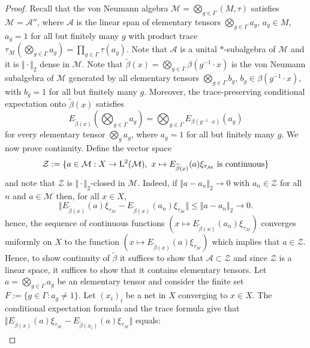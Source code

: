 \documentclass[12pt]{amsart} %
\theoremstyle{plain}
\theoremstyle{definition}
\begin{document}
\begin{proof}
Recall that the von Neumann algebra $\mathcal M=\bigotimes_{g\in\Gamma}(M,\tau)$ satisfies $\mathcal{M}=\mathcal{A}''$, where $\mathcal{A}$ is the linear span of elementary tensors $ \bigotimes_{g\in\Gamma}a_g$, $a_g\in M$,  $a_g=1$ for all but finitely many $g$ with product trace $\tau_{\mathcal M}\left(\bigotimes_{g\in\Gamma}a_g\right)=\prod_{g\in\Gamma}\tau(a_g)$. Note that $\mathcal{A}$ is a unital $*$-subalgebra of $\mathcal{M}$ and it is $\Vert\cdot\Vert_2$ dense in $\mathcal{M}$.
Note that $\widetilde\beta(x)
        =
        \bigotimes_{g\in\Gamma}\beta(g^{-1}\cdot x)$ is the von Neumann subalgebra of \(\mathcal M\) generated by all elementary tensors $\bigotimes_{g\in\Gamma}b_g$, $b_g\in\beta(g^{-1}\cdot x)$, with  $b_g=1$ for all but finitely many $g$. Moreover, the trace-preserving conditional expectation onto \(\widetilde\beta(x)\) satisfies
\[
        E_{\widetilde\beta(x)}
        \left(
        \bigotimes_{g\in\Gamma}a_g
        \right)
        =
        \bigotimes_{g\in\Gamma}E_{\beta(g^{-1}\cdot x)}(a_g)
\]
for every elementary tensor \(\bigotimes_g a_g\), where \(a_g=1\) for all but
finitely many \(g\).
\medskip
\noindent We now prove continuity. Define the vector space
$$\mathcal{Z}:=\{a\in\mathcal{M}:X\to{\rm L}^2(\mathcal{M}),\,\,x\mapsto E_{\widetilde{\beta}(x)}(a)\xi_{\tau_{\mathcal{M}}}\text{ is continuous}\}$$
and note that $\mathcal{Z}$ is $\Vert\cdot\Vert_2$-closed in $\mathcal{M}$. Indeed, if $\Vert a-a_n\Vert_2\to 0$ with $a_n\in\mathcal{Z}$ for all $n$ and $a\in\mathcal{M}$ then, for all $x\in X$,
$$\Vert E_{\widetilde{\beta}(x)}(a)\xi_{\tau_{\mathcal{M}}}-E_{\widetilde{\beta}(x)}(a_n)\xi_{\tau_{\mathcal{M}}}\Vert \leq\Vert a-a_n\Vert_2\rightarrow 0.$$
hence, the sequence of continuous functions $(x\mapsto E_{\widetilde{\beta}(x)}(a_n)\xi_{\tau_{\mathcal{M}}})$ converges uniformly on $X$ to the function $(x\mapsto E_{\widetilde{\beta}(x)}(a)\xi_{\tau_{\mathcal{M}}})$ which implies that $a\in\mathcal{Z}$. Hence, to show continuity of $\widetilde{\beta}$ it suffices to show that $\mathcal{A}\subset\mathcal{Z}$ and since $\mathcal{Z}$ is a linear space, it suffices to show that it contains elementary tensors. Let $a=\bigotimes_{g\in\Gamma}a_g$ be an elementary tensor and consider the finite set $F:=\{g\in\Gamma:a_g\neq1\}$. Let $(x_i)_i$ be a net in $X$ converging to $x\in X$. The conditional expectation formula and the trace formula give that $\Vert E_{\widetilde\beta(x)}(a)\xi_{\tau_{\mathcal{M}}}-E_{\widetilde\beta(x_i)}(a)\xi_{\tau_{\mathcal{M}}}\Vert$ equals:
\begin{eqnarray*}

\end{eqnarray*}
\end{proof}
\end{document}
